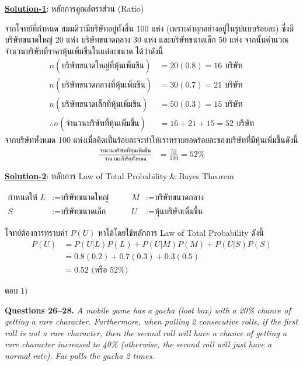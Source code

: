 \documentclass[11pt]{scrartcl}
\newcommand{\groupctx}[2]{\bigskip\noindent\textbf{Questions #1.} \textit{#2}\par\medskip}
\begin{document}
\begin{solutionbox}

  \underline{{\textbf{Solution-1}}}: หลักการคูณอัตราส่วน (Ratio)

  จากโจทย์ที่กำหนด สมมติว่ามีบริษัทอยู่ทั้งสิ้น 100 แห่ง (เพราะค่าทุกอย่างอยู่ในรูปแบบร้อยละ) ซึ่งมีบริษัทขนาดใหญ่ 20 แห่ง บริษัทขนาดกลาง 30 แห่ง และบริษัทขนาดเล็ก 50 แห่ง
  จากนั้นคำนวณจำนวนบริษัทที่ราคาหุ้นเพิ่มขึ้นในแต่ละขนาด ได้ว่าดังนี้
  \begin{align*}
    n(\text{บริษัทขนาดใหญ่ที่หุ้นเพิ่มขึน}) &= 20(0.8) = 16 \text{ บริษัท} \\
    n(\text{บริษัทขนาดกลางที่หุ้นเพิ่มขึน}) &= 30(0.7) = 21 \text{ บริษัท} \\
    n(\text{บริษัทขนาดเล็กที่หุ้นเพิ่มขึน}) &= 50(0.3) = 15 \text{ บริษัท} \\
    \therefore n(\text{จำนวนบริษัทที่หุ้นเพิ่มขึ้น}) &= 16+21+15 = 52 \text{ บริษัท}
  \end{align*}
  \vspace{-0.9pt}
  จากบริษัททั้งหมด 100 แห่งเมื่อคิดเป็นร้อยละจะทำให้เราทราบยอดร้อยละของบริษัทที่มีหุ้นเพิ่มขึ้นดังนี้
  \begin{align*}
    \frac{\text{จำนวนบริษัทที่หุ้นเพิ่มขึ้น}}{\text{จำนวนบริษัททั้งหมด}}
    &= \frac{52}{100} = 52\%
  \end{align*}

  \underline{{\textbf{Solution-2}}}: หลักการ Law of Total Probability \& Bayes Theorem
  \begin{flushleft}
    $\begin{aligned}
      \text{กำหนดให้ } L &:= \text{บริษัทขนาดใหญ่} &\qquad M &:= \text{บริษัทขนาดกลาง} \\
      S &:= \text{บริษัทขนาดเล็ก} &\qquad U &:= \text{หุ้นบริษัทเพิ่มขึ้น}
    \end{aligned}$
  \end{flushleft}
  โจทย์ต้องการทราบค่า $P(U)$ หาได้โดยใช้หลักการ Law of Total Probability ดังนี้
  \begin{align*}
    P(U)  &= P(U|L)P(L) + P(U|M)P(M) + P(U|S)P(S) \\
          &= 0.8(0.2) + 0.7(0.3) + 0.3(0.5) \\
          &= 0.52 \text{ (หรือ 52\%)}
  \end{align*}

  ตอบ $\boxed{1)}$
\end{solutionbox}

\newpage

\groupctx{26--28}{A mobile game has a gacha (loot box) with a 20\% chance of getting a rare character. Furthermore, when pulling 2 consecutive rolls, if the first roll is not a rare character, then the second roll will have a chance of getting a rare character increased to 40\% (otherwise, the second roll will just have a normal rate). Fai pulls the gacha 2 times.}
 
\end{document}
